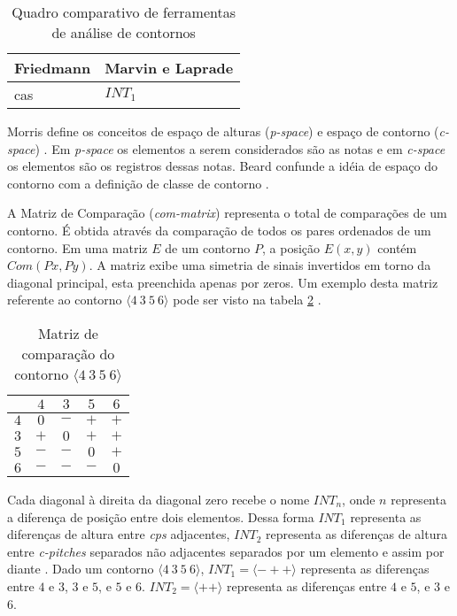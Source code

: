 \documentclass[12pt,brazil]{book}
\newcommand{\eng}[1]{\textit{#1}}
\newcommand{\eg}[1]{\textit{\gls{#1}}}
\begin{document}
\begin{table}
  \centering
  \begin{tabular}{l|l}
    Friedmann & Marvin e Laprade \\ \hline
    \gls{cas}  & $INT_1$ \\
  \end{tabular}
  \caption{Quadro comparativo de ferramentas de análise de contornos}
  \label{tab:compara-ferramentas}
\end{table}

Morris define os conceitos de espaço de alturas (\eg{p-space}) e
espaço de contorno (\eg{c-space}) \cite{morris87:composition}. Em
\eg{p-space} os elementos a serem considerados são as notas e em
\eg{c-space} os elementos são os registros dessas notas. Beard
confunde a idéia de espaço do contorno com a definição de classe de
contorno \cite[p. 11]{beard03:contour}.

A Matriz de Comparação (\eg{com-matrix}) representa o total de
comparações de um contorno. É obtida através da comparação de todos os
pares ordenados de um contorno. Em uma matriz $E$ de um contorno $P$,
a posição $E (x,y)$ contém $Com (Px,Py)$. A matriz exibe uma simetria
de sinais invertidos em torno da diagonal principal, esta preenchida
apenas por zeros. Um exemplo desta matriz referente ao contorno
$\langle 4\:3\:5\:6 \rangle$ pode ser visto na tabela
\ref{tab:matriz-4356} \cite[p. 28]{morris87:composition}.

\begin{table}
  \centering
  \begin{tabular}{r|cccc}
    & $4$ & $3$ & $5$ & $6$ \\
    \hline
    $4$ & $0$ & $-$ & $+$ & $+$ \\
    $3$ & $+$ & $0$ & $+$ & $+$ \\
    $5$ & $-$ & $-$ & $0$ & $+$ \\
    $6$ & $-$ & $-$ & $-$ & $0$ \\
  \end{tabular}
  \caption{Matriz de comparação do contorno $\langle 4\:3\:5\:6 \rangle$}
\label{tab:matriz-4356}
\end{table}

Cada diagonal à direita da diagonal zero recebe o nome $INT_n$, onde
$n$ representa a diferença de posição entre dois elementos. Dessa
forma $INT_1$ representa as diferenças de altura entre \eg{cps}
adjacentes, $INT_2$ representa as diferenças de altura entre
\eng{c-pitches} separados não adjacentes separados por um elemento e
assim por diante \cite[p. 231]{marvin.ea87:relating}. Dado um contorno
$\langle 4\:3\:5\:6 \rangle$, $INT_1 = \langle - + +\rangle$
representa as diferenças entre $4$ e $3$, $3$ e $5$, e $5$ e
$6$. $INT_2 = \langle + + \rangle$ representa as diferenças entre $4$
e $5$, e $3$ e $6$.
\end{document}
